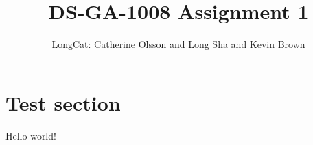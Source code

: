 \documentclass{article}
\title{DS-GA-1008 Assignment 1}
\author{LongCat: Catherine Olsson and Long Sha and Kevin Brown}
\begin{document}
\maketitle


\section{Test section}

Hello world!
\end{document}

